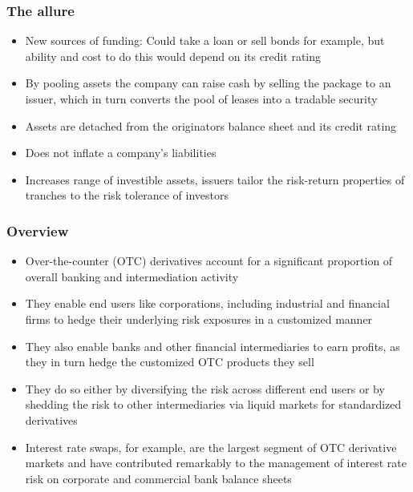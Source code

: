 \documentclass[11pt]{beamer}
\begin{document}
\begin{frame}
\frametitle{The allure}
\begin{itemize}
\item New sources of funding: Could take a loan or sell bonds for example, but ability and cost to do this would depend on its credit rating
\item By pooling assets the company can raise cash by selling the package to an issuer, which in turn converts the pool of leases into a tradable security
\item Assets are detached from the originators balance sheet and its credit rating
\item Does not inflate a company's liabilities
\item Increases range of investible assets,  issuers tailor the risk-return properties of tranches to the risk tolerance of investors
\end{itemize}
\end{frame}


\begin{frame}
\begin{center}
\end{center}
\end{frame}
\begin{frame}
\frametitle{Overview}
\begin{itemize}
\item Over-the-counter (OTC) derivatives account for a significant proportion of overall banking and intermediation activity
\item They enable end users like corporations, including industrial and financial firms to hedge their underlying risk exposures in a customized manner
\item They also enable banks and other financial intermediaries to earn profits, as they in turn hedge the customized OTC products they sell
\item They do so either by diversifying the risk across different end users or by shedding the risk to other intermediaries via liquid markets for standardized derivatives
\item Interest rate swaps, for example, are the largest segment of OTC derivative markets and have contributed remarkably to the management of interest rate risk on corporate and commercial bank balance sheets
\end{itemize}
\end{frame}
\end{document}
